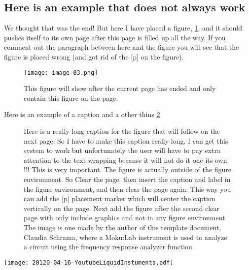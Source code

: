 \subsection{Here is an example that does not always work} \label{sec-Important}
We thought that was the end! But here I have placed a figure, \ref{fig:hallo2}, and it should pushes itself to its own page after this page is filled up all the way. If you comment out the paragraph between here and the figure you will see that the figure is placed wrong (and got rid of the [p] on the figure).

\lipsum[1]

\begin{figure}[p]
	\centering
	\texttt{[image: image-03.png]}
	\caption{This figure will show after the current page has ended and only contain this figure on the page. \cite{cite-xkcd_2016}}
	\label{fig:hallo2}
\end{figure}

\lipsum[2]

\lipsum[3]

\lipsum[1]

Here is an example of a caption and a other thins \ref{fig:WayToBig}

\clearpage

\begin{figure}[p]
	\centering
	\caption{Here is a really long caption for the figure that will follow on the next page. So I have to make this caption really long. I can get this system to work but unfortunately the user will have to pay extra attention to the text wrapping because it will not do it one its own !!! This is very important. The figure is actually outside of the figure environment. So Clear the page, then insert the caption and label in the figure environment, and then clear the page again. This way you can add the [p] placement marker which will center the caption vertically on the page. Next add the figure after the second clear page with only include graphics and not in any figure environment. The image is one made by the author of this template document, Claudia Schrama, where a Moku:Lab instrument is used to analyze a circuit using the frequency response analyzer function. }
	\label{fig:WayToBig}
\end{figure}

\clearpage

\vspace*{\fill}
\begin{center}
	\texttt{[image: 20120-04-16-YoutubeLiquidInstuments.pdf]}
\end{center}
\vspace*{\fill}

\clearpage


